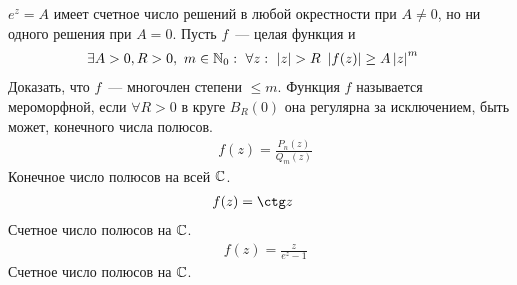 \Example
$e^z = A$ имеет счетное число решений в любой окрестности при $A \neq 0$, но ни
одного решения при $A = 0$.
\Exse
Пусть $f$~--- целая функция и
\begin{align*}
  & \exists A > 0, R > 0, \ m \in \mathbb{N}_0: \ \forall z: \ \left| z \right| > R \ \left| f(z) \right| \geq A \left| z \right|^m
\end{align*}
Доказать, что $f$~--- многочлен степени $\leq m$.
\Def
Функция $f$ называется мероморфной, если $\forall R > 0$ в круге $B_R(0)$ она
регулярна за исключением, быть может, конечного числа полюсов.
\Example
\begin{align*}
  & f(z) = \frac{P_n(z)}{Q_m(z)}
\end{align*}
Конечное число полюсов на всей $\mathbb{C}$.
\Example
\begin{align*}
  & f(z) = \ctg z
\end{align*}
Счетное число полюсов на $\mathbb{C}$.
\Example
\begin{align*}
  & f(z) = \frac{z}{e^z-1}
\end{align*}
Счетное число полюсов на $\mathbb{C}$.